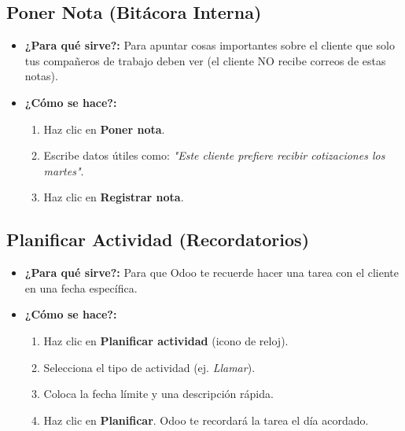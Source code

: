 \documentclass[11pt,a4paper]{article}
\begin{document}
\subsection{Poner Nota (Bitácora Interna)}
\begin{itemize}
    \item \textbf{¿Para qué sirve?:} Para apuntar cosas importantes sobre el cliente que solo tus compañeros de trabajo deben ver (el cliente NO recibe correos de estas notas).
    \item \textbf{¿Cómo se hace?:}
    \begin{enumerate}
        \item Haz clic en \textbf{Poner nota}.
        \item Escribe datos útiles como: \textit{"Este cliente prefiere recibir cotizaciones los martes"}.
        \item Haz clic en \textbf{Registrar nota}.
    \end{enumerate}
\end{itemize}

\subsection{Planificar Actividad (Recordatorios)}
\begin{itemize}
    \item \textbf{¿Para qué sirve?:} Para que Odoo te recuerde hacer una tarea con el cliente en una fecha específica.
    \item \textbf{¿Cómo se hace?:}
    \begin{enumerate}
        \item Haz clic en \textbf{Planificar actividad} (icono de reloj).
        \item Selecciona el tipo de actividad (ej. \textit{Llamar}).
        \item Coloca la fecha límite y una descripción rápida.
        \item Haz clic en \textbf{Planificar}. Odoo te recordará la tarea el día acordado.
    \end{enumerate}
\end{itemize}
\end{document}

